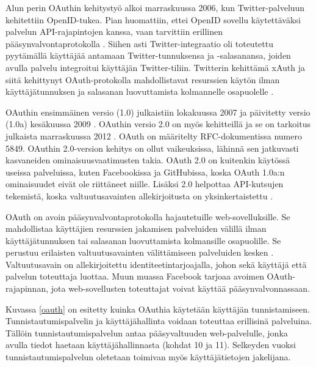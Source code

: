 Alun perin OAuthin kehitystyö alkoi marraskuussa 2006, kun Twitter-pal\-ve\-luun kehitettiin OpenID-tukea. Pian huomattiin, ettei OpenID sovellu käytettäväksi palvelun API-rajapintojen kanssa, vaan tarvittiin erillinen pääsynvalvontaprotokolla \cite{oauth_primer}. Siihen asti Twitter-integraatio oli toteutettu pyytämällä käyttäjää antamaan Twitter-tunnuksensa ja -salasanansa, joiden avulla palvelu integroitui käyttäjän Twitter-tiliin. Twitterin kehittämä xAuth ja siitä kehittynyt OAuth-protokolla mahdollistavat resurssien käytön ilman käyttäjätunnuksen ja salasanan luovuttamista kolmannelle osapuolelle \cite{oauth2_0}.

OAuthin ensimmäinen versio (1.0) julkaistiin lokakuussa 2007 ja päivitetty versio (1.0a) kesäkuussa 2009 \cite{oauth2_0}. OAuthin versio 2.0 on myös kehitteillä ja se on tarkoitus julkaista marraskuussa 2012 \cite{oauth2_0}. OAuth on määritelty RFC-dokumentissa numero 5849. OAuthin 2.0-version kehitys on ollut vaikeuksissa, lähinnä sen jatkuvasti kasvaneiden ominaisuusvaatimusten takia. OAuth 2.0 on kuitenkin käytössä useissa palveluissa, kuten Facebookissa ja GitHubissa, koska OAuth 1.0a:n ominaisuudet eivät ole riittäneet niille. Lisäksi 2.0 helpottaa API-kutsujen tekemistä, koska valtuutusavainten allekirjoitusta on yksinkertaistettu \cite{oauth2_0}.

OAuth on avoin pääsynvalvontaprotokolla hajautetuille web-sovelluksille. Se mahdollistaa käyttäjien resurssien jakamisen palveluiden välillä ilman käyttäjätunnuksen tai salasanan luovuttamista kolmansille osapuolille. Se perustuu erilaisten valtuutusavainten välittämiseen palveluiden kesken \cite{oauth2_0}. Valtuutusavain on allekirjoitettu identiteetintarjoajalla, johon sekä käyttäjä että palvelun toteuttaja luottaa. Muun muassa Facebook tarjoaa avoimen OAuth-rajapinnan, jota web-sovellusten toteuttajat voivat käyttää pääsynvalvonnassaan.

Kuvassa \ref{oauth} on esitetty kuinka OAuthia käytetään käyttäjän tunnistamiseen. Tunnistautumispalvelin ja käyttäjähallinta voidaan toteuttaa erillisinä palveluina. Tällöin tunnistautumispalvelun antaa pääsyvaltuuden web-palvelulle, jonka avulla tiedot haetaan käyttäjähallinnasta (kohdat 10 ja 11). Selkeyden vuoksi tunnistautumispalvelun oletetaan toimivan myös käyttäjätietojen jakelijana.


